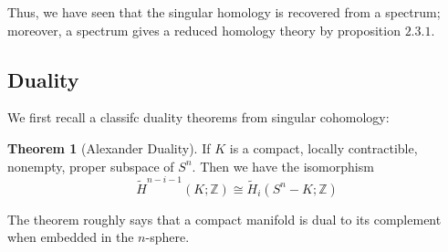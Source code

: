 \documentclass{article}
\theoremstyle{definition}
\newtheorem{theorem}{Theorem}[section]
\theoremstyle{definition}
\theoremstyle{definition}
\theoremstyle{definition}
\theoremstyle{definition}
\theoremstyle{definition}
\theoremstyle{definition}
\begin{document}
Thus, we have seen that the singular homology is recovered from a spectrum; moreover, a spectrum gives a reduced homology theory by proposition $2.3.1$. 

\subsection{Duality}
We first recall a classifc duality theorems from singular cohomology:

\begin{tcolorbox}[colback=red!5!white,colframe=red!30!white]
\begin{theorem}[Alexander Duality]
If $K$ is a compact, locally contractible, nonempty, proper subspace of $S^n$. Then we have the isomorphism
\[\tilde{H}^{n-i-1}(K;\mathbb{Z})\cong \tilde{H}_i(S^n-K;\mathbb{Z})\] 
\end{theorem}
\end{tcolorbox}
The theorem roughly says that a compact manifold is dual to its complement when embedded in the $n$-sphere. 
\end{document}
